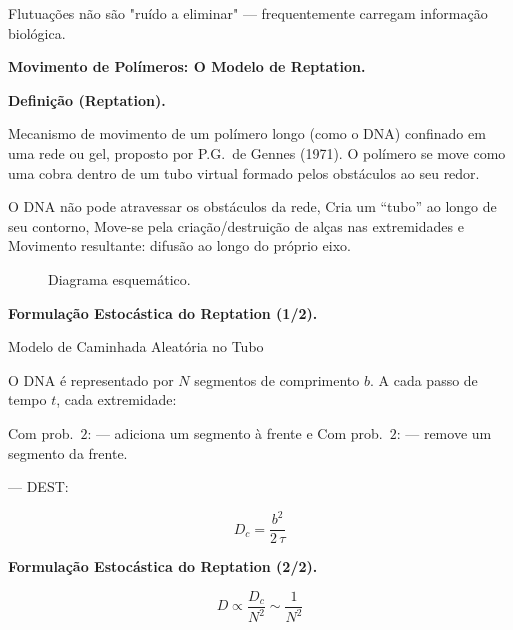 Flutuações não são "ruído a eliminar" — frequentemente carregam informação biológica.

\textbf{Movimento de Polímeros: O Modelo de Reptation.}

\textbf{Definição (Reptation).}

Mecanismo de movimento de um polímero longo (como o DNA) confinado em uma rede ou gel, proposto por P.G.\ de Gennes (1971). O polímero se move como uma cobra dentro de um tubo virtual formado pelos obstáculos ao seu redor.

O DNA não pode atravessar os obstáculos da rede, Cria um ``tubo'' ao longo de seu contorno, Move-se pela criação/destruição de alças nas extremidades e Movimento resultante: difusão ao longo do próprio eixo.

%
\begin{figure}[htbp]
\centering
{}
\caption{Diagrama esquemático.}
\end{figure}
%

\textbf{Formulação Estocástica do Reptation (1/2).}

Modelo de Caminhada Aleatória no Tubo

O DNA é representado por $N$ segmentos de comprimento $b$. A cada passo de tempo $ t$, cada extremidade:

Com prob.\ $2$: — adiciona um segmento à frente e Com prob.\ $2$: — remove um segmento da frente.

--- DEST: 

%
\begin{equation*}
D_c = \frac{b^2}{2\,\tau}
\end{equation*}
%

\textbf{Formulação Estocástica do Reptation (2/2).}

%
\begin{equation*}
D \propto \frac{D_c}{N^2} \sim \frac{1}{N^2}
\end{equation*}
%

